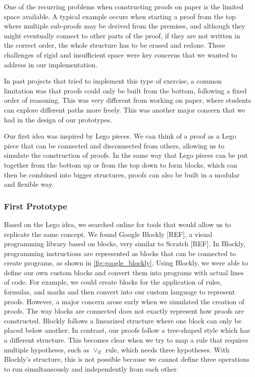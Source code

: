 One of the recurring problems when constructing proofs on paper is the limited space available. A typical example occurs when starting a proof from the top where multiple sub-proofs may be derived from the premises, and although they might eventually connect to other parts of the proof, if they are not written in the correct order, the whole structure has to be erased and redone. These challenges of rigid and insufficient space were key concerns that we wanted to address in our implementation.

In past projects that tried to implement this type of exercise, a common limitation was that proofs could only be built from the bottom, following a fixed order of reasoning. This was very different from working on paper, where students can explore different paths more freely. This was another major concern that we had in the design of our prototypes.

Our first idea was inspired by Lego pieces. We can think of a proof as a Lego piece that can be connected and disconnected from others, allowing us to simulate the construction of proofs. In the same way that Lego pieces can be put together from the bottom up or from the top down to form blocks, which can then be combined into bigger structures, proofs can also be built in a modular and flexible way.

\subsubsection{First Prototype}
Based on the Lego idea, we searched online for tools that would allow us to replicate the same concept. We found Google Blockly [REF], a visual programming library based on blocks, very similar to Scratch [REF]. In Blockly, programming instructions are represented as blocks that can be connected to create programs, as shown in \autoref{fig:google_blockly}. Using Blockly, we were able to define our own custom blocks and convert them into programs with actual lines of code. For example, we could create blocks for the application of rules, formulas, and marks and then convert into our custom language to represent proofs. However, a major concern arose early when we simulated the creation of proofs. The way blocks are connected does not exactly represent how proofs are constructed. Blockly follows a linearized structure where one block can only be placed below another. In contrast, our proofs follow a tree-shaped style which has a different structure. This becomes clear when we try to map a rule that requires multiple hypotheses, such as $\vee_E$ rule, which needs three hypotheses. With Blockly's structure, this is not possible because we cannot define three operations to run simultaneously and independently from each other.

